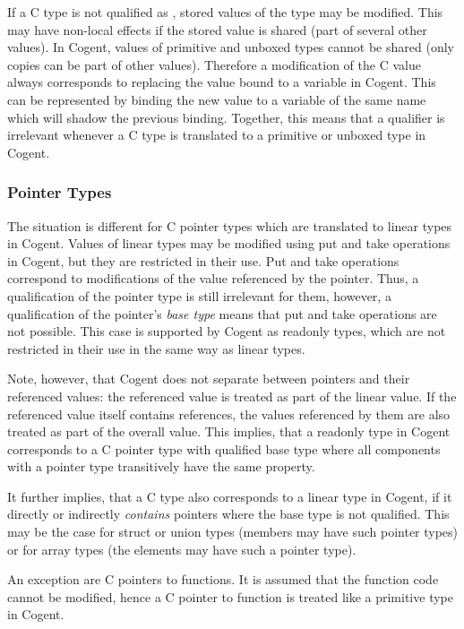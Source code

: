 If a C type is not qualified as , stored values of the type may be modified. This may have non-local
effects if the stored value is shared (part of several other values). In Cogent, values of primitive and unboxed types
cannot be shared (only copies can be part of other values). Therefore a modification of the C value always corresponds to
replacing the value bound to a variable in Cogent. This can be represented by binding the new value to a variable
of the same name which will shadow the previous binding. Together, this means that a  qualifier is
irrelevant whenever a C type is translated to a primitive or unboxed type in Cogent.

\subsubsection{Pointer Types}

The situation is different for C pointer types which are translated to linear types in Cogent. Values of linear types
may be modified using put and take operations in Cogent, but they are restricted in their use. Put and take operations
correspond to modifications of the value referenced by the pointer. Thus, a  qualification of the pointer
type is still irrelevant for them, however, a  qualification of the pointer's \textit{base type} means
that put and take operations are not possible. This case is supported by Cogent as readonly types, which are not
restricted in their use in the same way as linear types.

Note, however, that Cogent does not separate between pointers and their referenced values: the referenced value
is treated as part of the linear value. If the referenced value itself contains references, the values referenced
by them are also treated as part of the overall value. This implies, that a readonly type in Cogent corresponds to
a C pointer type with  qualified base type where all components with a pointer type transitively have
the same property.

It further implies, that a C type also corresponds to a linear type in Cogent, if it directly or indirectly 
\textit{contains} pointers where the base type is not  qualified. This may be the case for struct or union
types (members may have such pointer types) or for array types (the elements may have such a pointer type).

An exception are C pointers to functions. It is assumed that the function code cannot be modified, hence a C pointer 
to function is treated like a primitive type in Cogent.


